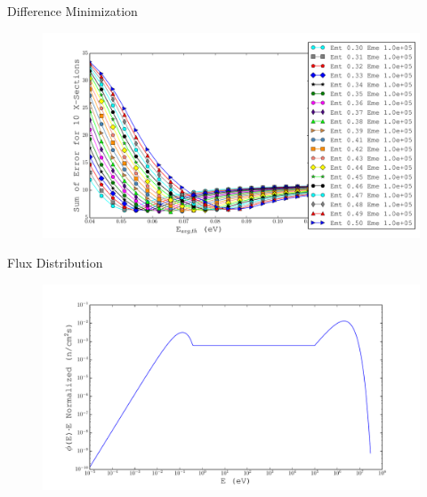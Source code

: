 \documentclass{beamer}
\begin{document}
\begin{frame}{Difference Minimization}
  \begin{figure}[H]
    \begin{center}
      \hspace*{-0.9cm}\includegraphics[width=1.1\columnwidth]{../Weighting/Reduce_Err/E0_vs_SumErr_third.pdf}
      \vspace{-5mm}
      \label{fig:err}
    \end{center}
  \end{figure}
\end{frame}

\begin{frame}{Flux Distribution}
  \begin{figure}[H]
    \begin{center}
      \hspace*{-0.5cm}\includegraphics[width=1.1\columnwidth]{../Weighting/Flux_Spectra.pdf}
      \vspace{-5mm}
      \label{fig:Flux}
    \end{center}
  \end{figure}
\end{frame}
\end{document}
